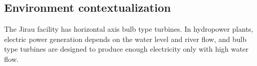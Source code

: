 \subsection{Environment contextualization}\label{sec::desc_contex}

The Jirau facility has horizontal axis bulb type turbines. In hydropower
plants, electric power generation depends on the water level and river flow,
and bulb type turbines are designed to produce enough electricity only with
high water flow. %
 


